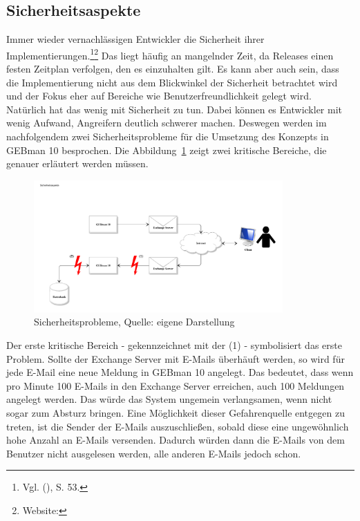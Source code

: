 \subsection{Sicherheitsaspekte}
\noindent
Immer wieder vernachlässigen Entwickler die Sicherheit ihrer Implementierungen.\footnote{Vgl. \citeauthor{Ziegler} (\citeyear{Ziegler}), S. 53.}\footnote{Website:\cite{Sicherheit1}} Das liegt häufig an mangelnder Zeit, da Releases einen festen Zeitplan verfolgen, den es einzuhalten gilt. Es kann aber auch sein, dass die Implementierung nicht aus dem Blickwinkel der Sicherheit betrachtet wird und der Fokus eher auf Bereiche wie Benutzerfreundlichkeit gelegt wird. Natürlich hat das wenig mit Sicherheit zu tun. Dabei können es Entwickler mit wenig Aufwand, Angreifern deutlich schwerer machen. Deswegen werden im nachfolgendem zwei Sicherheitsprobleme für die Umsetzung des Konzepts in GEBman 10 besprochen. Die Abbildung~\ref{fig:Sicherheitsprobleme} zeigt zwei kritische Bereiche, die genauer erläutert werden müssen.

\begin{figure}[h!]
\centering
\includegraphics[width=0.85\textwidth]{Abbildungen/Sicherheitsaspekte.pdf}
	\caption[Sicherheitsprobleme]{Sicherheitsprobleme, Quelle: eigene Darstellung}
	\label{fig:Sicherheitsprobleme}
\end{figure}

\noindent
Der erste kritische Bereich - gekennzeichnet mit der (1) - symbolisiert das erste Problem. Sollte der Exchange Server mit E-Mails überhäuft werden, so wird für jede E-Mail eine neue Meldung in GEBman 10 angelegt. Das bedeutet, dass wenn pro Minute 100 E-Mails in den Exchange Server erreichen, auch 100 Meldungen angelegt werden. Das würde das System ungemein verlangsamen, wenn nicht sogar zum Absturz bringen. Eine Möglichkeit dieser Gefahrenquelle entgegen zu treten, ist die Sender der E-Mails auszuschließen, sobald diese eine ungewöhnlich hohe Anzahl an E-Mails versenden. Dadurch würden dann die E-Mails von dem Benutzer nicht ausgelesen werden, alle anderen E-Mails jedoch schon.\\

